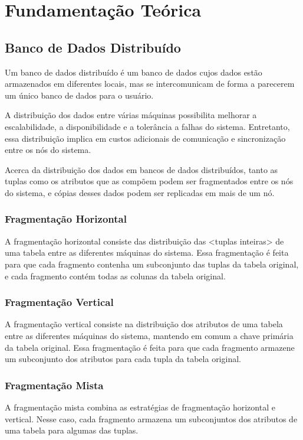 \section{Fundamentação Teórica}
\subsection{Banco de Dados Distribuído}
Um banco de dados distribuído é um banco de dados cujos dados estão armazenados em diferentes locais, 
mas se intercomunicam de forma a parecerem um único banco de dados para o usuário.

A distribuição dos dados entre várias máquinas possibilita melhorar a escalabilidade,
a disponibilidade e a tolerância a falhas do sistema. Entretanto, essa distribuição 
implica em custos adicionais de comunicação e sincronização entre os nós do sistema.

Acerca da distribuição dos dados em bancos de dados distribuídos, 
tanto as tuplas como os atributos que as compõem podem ser fragmentados entre os nós do sistema,
e cópias desses dados podem ser replicadas em mais de um nó. 

\subsubsection{Fragmentação Horizontal}
A fragmentação horizontal consiste das distribuição das <tuplas inteiras> de uma tabela entre as diferentes máquinas do sistema.
Essa fragmentação é feita para que cada fragmento contenha um subconjunto das tuplas da tabela original,
e cada fragmento contém todas as colunas da tabela original.

\subsubsection{Fragmentação Vertical}
A fragmentação vertical consiste na distribuição dos atributos de uma tabela entre as diferentes máquinas do sistema, 
mantendo em comum a chave primária da tabela original.
Essa fragmentação é feita para que cada fragmento armazene um subconjunto dos atributos para cada tupla da tabela original.

\subsubsection{Fragmentação Mista}
A fragmentação mista combina as estratégias de fragmentação horizontal e vertical.
Nesse caso, cada fragmento armazena um subconjuntos dos atributos de uma tabela para algumas das tuplas.

